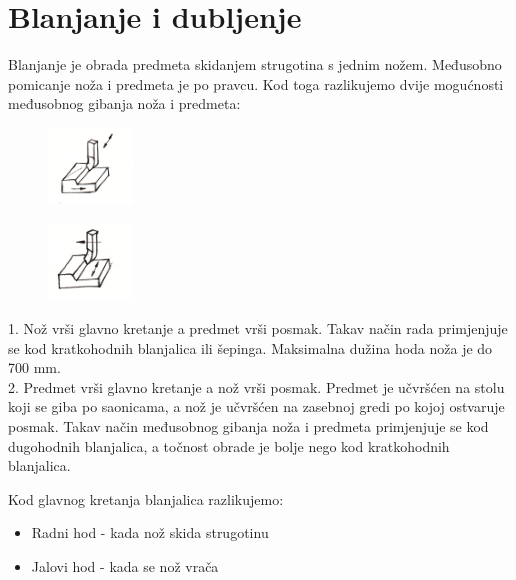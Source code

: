 \documentclass[a4paper,12pt]{article}
\numberwithin{figure}{section}
\begin{document}
\section{Blanjanje i dubljenje}
Blanjanje je obrada predmeta skidanjem strugotina s jednim nožem. Međusobno pomicanje noža i predmeta je po pravcu. Kod toga razlikujemo dvije mogućnosti međusobnog gibanja noža i predmeta:\\
\begin{figure}
  \begin{center}
  \vspace{-1cm}
    \includegraphics[width=0.2\textwidth]{image_14-1.png}
  \end{center}
\end{figure}
\begin{figure}
\vspace{-3cm}
  \begin{center}
    \includegraphics[width=0.2\textwidth]{image_14-2.png}
  \end{center}
\end{figure}
1. Nož vrši glavno kretanje a predmet vrši posmak. Takav način rada primjenjuje se kod kratkohodnih blanjalica ili šepinga. Maksimalna dužina hoda noža je do 700 mm.\\
2. Predmet vrši glavno kretanje a nož vrši posmak. Predmet je učvršćen na stolu koji se giba po saonicama, a nož je učvršćen na zasebnoj gredi po kojoj ostvaruje posmak. Takav način međusobnog gibanja noža i predmeta primjenjuje se kod dugohodnih blanjalica, a točnost obrade je bolje nego kod kratkohodnih blanjalica.\par
\vspace{2cm}
\noindent Kod glavnog kretanja blanjalica razlikujemo:
\begin{itemize}
\item Radni hod - kada nož skida strugotinu
\item Jalovi hod - kada se nož vrača
\end{itemize}
\end{document}
